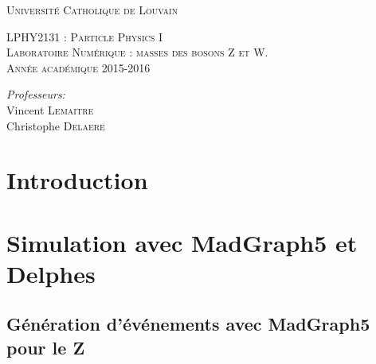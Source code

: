 \documentclass[a4paper]{report}
\renewcommand{\bibname}{R\'ef\'erences}
\begin{document}
\def\w{\par \vspace{\baselineskip}}
\renewcommand{\bibname}{R\'ef\'erences}
  \begin{titlepage}
  \begin{center}

\textsc{\Large Université Catholique de Louvain }\\[0.5cm]
\w
\w
\textsc{\huge LPHY2131 : Particle Physics I }\\[0.34cm]
\textsc{\large Laboratoire Numérique : masses des bosons Z et W.}\\[0.7cm]
\textsc{\large Année académique 2015-2016}\\[0.7cm]
\w
\begin{center}




\end{center}
\begin{minipage}{0.6\textwidth}
\begin{center}
\large
\emph{Professeurs:}\\
Vincent \textsc{Lemaitre}\\
Christophe \textsc{Delaere}\\
\end{center}



\end{minipage} 



\end{center}



\end{titlepage}
\tableofcontents
\newpage
\renewcommand{\thesection}{\arabic{section}}
\newcommand{\orto}{^{\circ}}
\section{Introduction}



\section{Simulation avec MadGraph5 et Delphes}

\subsection{Génération d'événements avec MadGraph5 pour le Z}
\end{document}
